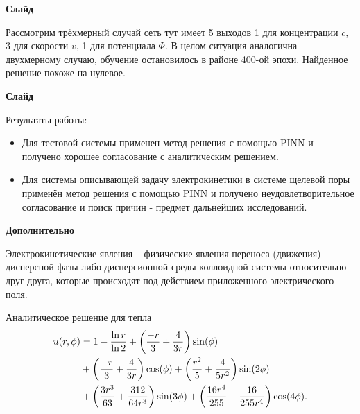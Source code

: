 \documentclass[a4paper,14pt]{extarticle} %
\begin{document}
\textbf{Слайд}

Рассмотрим трёхмерный случай сеть тут имеет 5 выходов 1 для концентрации $c$, 3 для скорости $v$, 1 для потенциала $\Phi$. В целом ситуация аналогична двухмерному случаю, обучение остановилось в районе 400-ой эпохи. Найденное решение похоже на нулевое.

\textbf{Слайд}

Результаты работы:
\begin{itemize}
    \item Для тестовой системы применен метод решения с помощью PINN и получено хорошее согласование с аналитическим решением.
    \item Для системы описывающей задачу электрокинетики в системе щелевой поры применён метод решения с помощью PINN и получено неудовлетворительное согласование и поиск причин - предмет дальнейших исследований.
\end{itemize}

\textbf{Дополнительно}

Электрокинетические явления -- физические явления переноса (движения) дисперсной фазы либо дисперсионной среды коллоидной системы относительно друг друга, которые происходят под действием приложенного электрического поля.

Аналитическое решение для тепла 
\begin{equation*}\label{eq:termal}
    \begin{split}
        u(r,\phi) & = 1-\frac{\ln r}{\ln 2}+{\left( \frac{-r}{3}+\frac{4}{3r} \right)}\sin(\phi)\\
        &+{\left( \frac{-r}{3}+\frac{4}{3r} \right)}\cos(\phi)+{\left( \frac{r^2}{5}+\frac{4}{5r^2} \right)}\sin(2\phi)\\
        &+{\left( \frac{3r^3}{63}+\frac{312}{64r^3} \right)}\sin(3\phi)+{\left( \frac{16r^4}{255}-\frac{16}{255r^4} \right)}\cos(4\phi).
    \end{split}
\end{equation*}
\end{document}
